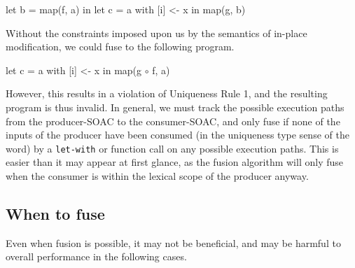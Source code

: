 \begin{colorcode}
let b = map(f, a) in
let c = a with [i] <- x in
map(g, b)
\end{colorcode}

Without the constraints imposed upon us by the semantics of in-place
modification, we could fuse to the following program.

\begin{colorcode}
let c = a with [i] <- x in
map(g \(\circ\) f, a)
\end{colorcode}

However, this results in a violation of Uniqueness Rule 1, and the
resulting program is thus invalid.  In general, we must track the
possible execution paths from the producer-SOAC to the consumer-SOAC,
and only fuse if none of the inputs of the producer have been consumed
(in the uniqueness type sense of the word) by a \texttt{let-with} or
function call on any possible execution paths.  This is easier than it
may appear at first glance, as the fusion algorithm will only fuse
when the consumer is within the lexical scope of the producer anyway.

\subsection{When to fuse}
\label{sec:whentofuse}

Even when fusion is possible, it may not be beneficial, and may be
harmful to overall performance in the following cases.

